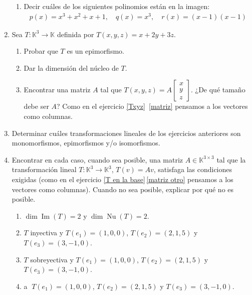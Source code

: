 \begin{enumerate}[topsep=6pt, itemsep=.4cm]
\begin{enumerate}
        \item Decir cuáles de los siguientes polinomios están en la imagen:
            \begin{align*}
                p(x)=x^3+x^2+x+1,\quad q(x)=x^3, \quad r(x)=(x-1)(x-1) 
            \end{align*}
    \end{enumerate}



\item\label{funcional ej}  Sea $T:\mathbb{K}^3\longrightarrow\mathbb{K}$ definida por $T(x,y,z)=x+2y+3z$.
\begin{enumerate}
    \item Probar que $T$ es un epimorfismo.
    \item Dar la dimensión del núcleo de $T$.
    \item Encontrar una matriz $A$ tal que
        $T(x,y,z)=A\begin{bmatrix}
        x\\y\\z \end{bmatrix}$. ¿De qué tamaño debe ser $A$? Como en el ejercicio \ref{Txyz}\, \ref{matriz} pensamos a los vectores como columnas. 
\end{enumerate}


\item Determinar cuáles transformaciones lineales de los ejercicios anteriores son monomorfismos, epimorfismos y/o isomorfismos.


\item\label{usar-1} Encontrar en cada caso, cuando sea posible, una matriz $A\in\mathbb{K}^{3\times 3}$ tal que la transformación lineal $T:\mathbb{K}^3\longrightarrow\mathbb{K}^3$, $T(v)=Av$, satisfaga las condiciones exigidas (como en el ejercicio  \ref{T en la base}\,\ref{matriz otro} pensamos a los vectores como columnas). Cuando no sea posible, explicar por qué no es posible.
\begin{enumerate}[ topsep=5pt,itemsep=5pt]
    \item $\operatorname{dim} \operatorname{Im}(T)=2$ y $\operatorname{dim}\operatorname{Nu}(T)=2$.
    \item $T$ inyectiva y $T(e_1)=(1,0,0)$, $T(e_2)=(2,1,5)$ y $T(e_3)=(3,-1,0)$.
    \item $T$ sobreyectiva y $T(e_1)=(1,0,0)$, $T(e_2)=(2,1,5)$ y $T(e_3)=(3,-1,0)$.
    
    \item\label{usar Txyz} \textcircled{a} $T(e_1)=(1,0,0)$, $T(e_2)=(2,1,5)$ y $T(e_3)=(3,-1,0)$.
    

\end{enumerate}
\end{enumerate}
